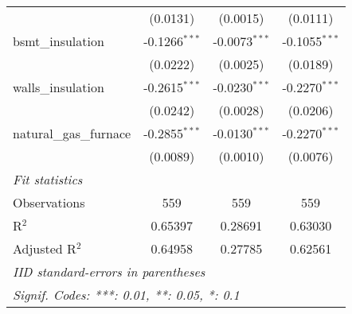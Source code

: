 \begin{tabular}{lccc}
                           & (0.0131)                                                                 & (0.0015)                                                                    & (0.0111)\\
   bsmt\_insulation       & -0.1266$^{***}$                                                          & -0.0073$^{***}$                                                             & -0.1055$^{***}$\\
                           & (0.0222)                                                                 & (0.0025)                                                                    & (0.0189)\\
   walls\_insulation      & -0.2615$^{***}$                                                          & -0.0230$^{***}$                                                             & -0.2270$^{***}$\\
                           & (0.0242)                                                                 & (0.0028)                                                                    & (0.0206)\\
   natural\_gas\_furnace & -0.2855$^{***}$                                                          & -0.0130$^{***}$                                                             & -0.2270$^{***}$\\
                           & (0.0089)                                                                 & (0.0010)                                                                    & (0.0076)\\
   \midrule \emph{Fit statistics} &   &   &  \\
   Observations            & 559                                                                      & 559                                                                         & 559\\
   R$^2$                   & 0.65397                                                                  & 0.28691                                                                     & 0.63030\\
   Adjusted R$^2$          & 0.64958                                                                  & 0.27785                                                                     & 0.62561\\
   \midrule\midrule\multicolumn{4}{l}{\emph{IID standard-errors in parentheses}}\\
   \multicolumn{4}{l}{\emph{Signif. Codes: ***: 0.01, **: 0.05, *: 0.1}}\\
\end{tabular}


